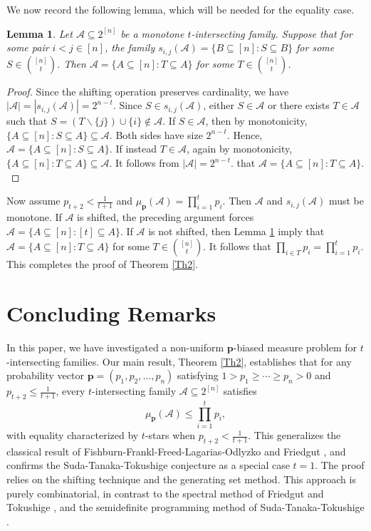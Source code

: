 \documentclass[11pt]{article}
\newtheorem{lemma}[theorem]{Lemma}
\begin{document}
We now record the following lemma, which will be needed for the equality case.


\begin{lemma}\label{cla}
Let $\mathcal{A} \subseteq 2^{[n]}$ be a monotone $t$-intersecting family. 
Suppose that for some pair $i<j \in [n]$, the family 
$s_{i,j}(\mathcal{A})= \{ B \subseteq [n] : S\subseteq B \}$ for some $S\in \binom{[n]}{t}$.
Then $\mathcal{A} =\{ A \subseteq [n] : T \subseteq A \}$ for some $T\in \binom{[n]}{t}$.
\end{lemma}
\begin{proof}
Since the shifting operation preserves cardinality, we have
$
|\mathcal{A}| = |s_{i,j}(\mathcal{A})| = 2^{n-t}. 
$
Since $S \in s_{i,j}(\mathcal{A})$,  either $S \in \mathcal{A}$ or there exists $T \in \mathcal{A}$ such that $S=(T\backslash \{j\})\cup\{i\}\notin \mathcal{A}$.
If  $S \in \mathcal{A}$, then by monotonicity,  $
\{A \subseteq [n] : S\subseteq A \} \subseteq \mathcal{A}$.
Both sides have size $2^{n-t}$. Hence, 
$\mathcal{A}=\{A \subseteq [n] : S\subseteq A \}$.
If instead $T \in \mathcal{A} $, again by monotonicity,
$
\{ A \subseteq [n] : T \subseteq A \} \subseteq \mathcal{A}.
$
It follows from $
|\mathcal{A}| =  2^{n-t}. 
$ that
$
\mathcal{A} = \{ A \subseteq [n] : T \subseteq A \}.
$
\end{proof}

Now assume $p_{t+2}  < \frac{1}{t+1}$ and
$\mu_\textbf{p}(\mathcal{A})= \prod_{i=1}^t p_i$.
Then $\mathcal{A}$ and  $s_{i,j}(\mathcal{A})$ must be monotone.
If $\mathcal{A}$ is shifted, the preceding  argument forces  $\mathcal{A} = \{ A \subseteq [n] : [t]\subseteq A \}$. If $\mathcal{A}$ is not shifted, then Lemma  \ref{cla} imply that $\mathcal{A}=\{A\subseteq [n]: T\subseteq A\}$ for some $T\in \binom{[n]}{t}$. It follows that $\prod_{i\in T} p_i=\prod_{i=1}^t p_i$.
This completes the proof of Theorem \ref{Th2}.

\section{Concluding Remarks}\label{se4}

In this paper, we have investigated a non-uniform $\mathbf{p}$-biased measure problem for $t$-intersecting families. Our main result, Theorem \ref{Th2}, establishes that for any probability vector $\textbf{p}=(p_1,p_2,\ldots,p_n)$ satisfying 
$1>p_1\ge\cdots\ge p_n>0$ and $p_{t+2}\le\frac{1}{t+1}$, every $t$-intersecting family $\mathcal{A}\subseteq 2^{[n]}$ satisfies
$$
\mu_{\mathbf{p}}(\mathcal{A}) \le \prod_{i=1}^t p_i,
$$
with equality characterized by $t$-stars when $p_{t+2}<\frac{1}{t+1}$. This generalizes the classical result  of Fishburn-Frankl-Freed-Lagarias-Odlyzko \cite{F86} and Friedgut \cite{F08}, and confirms the Suda-Tanaka-Tokushige conjecture \cite{S17} as a special case $t=1$.
The proof relies on the shifting technique and the generating set method. This approach is purely combinatorial, in contrast to the spectral method of Friedgut \cite{F08} and Tokushige \cite{T22}, and the semidefinite programming method of Suda-Tanaka-Tokushige \cite{S17}.
\end{document}
